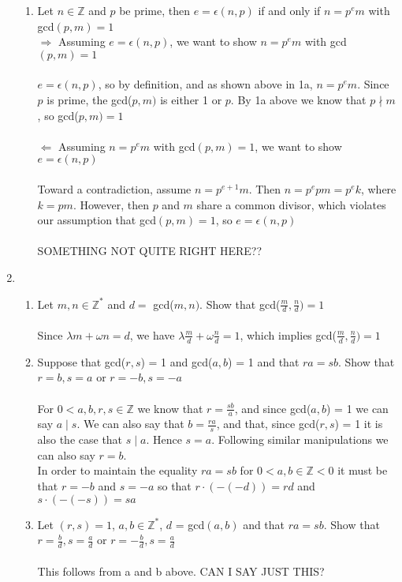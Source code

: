 \documentclass[11pt]{article}
\begin{document}
\begin{enumerate}
\begin{enumerate}
\item Let $n \in \mathbb{Z}$ and $p$ be prime, then $e = \epsilon(n,p)$ if and only if $n = p^em$ with gcd$(p,m) = 1$\\
$\Rightarrow$ Assuming $e = \epsilon(n,p)$, we want to show $n = p^em$ with gcd$(p,m) = 1$\\
\\
$e = \epsilon(n, p)$, so by definition, and as shown above in 1a, $n = p^em$.  Since $p$ is prime, the gcd($p,m)$ is either 1 or $p$.  By 1a above we know that $p \nmid m$, so gcd($p, m) = 1$
\\
\\
$\Leftarrow$ Assuming $n = p^em$ with gcd$(p,m) = 1$, we want to show $e = \epsilon(n,p)$\\
\\
Toward a contradiction, assume $n = p^{e+1}m$.  Then $n = p^epm = p^ek$, where $k = pm$.  However, then $p$ and $m$ share a common divisor, which violates our assumption that gcd$(p,m) = 1$, so $e = \epsilon(n,p)$\\
\\
SOMETHING NOT QUITE RIGHT HERE??
\end{enumerate}


\newpage %
\item 
\begin{enumerate}
\item Let $m,n \in \mathbb{Z}^*$ and $d = $ gcd($m,n)$.  Show that gcd($\tfrac{m}{d} , \tfrac{n}{d}) = 1$
\\\\
Since $\lambda m + \omega n = d$, we have $\lambda \tfrac{m}{d} + \omega \tfrac{n}{d} = 1$, which implies gcd($\tfrac{m}{d} , \tfrac{n}{d}) = 1$
\\
\item Suppose that gcd($r,s$) = 1 and gcd($a,b$) = 1 and that $ra = sb$.  Show that $r=b, s = a$ or $r = -b, s = -a$
\\\\
For $0 < a,b,r,s \in \mathbb{Z}$ we know that $r=\tfrac{sb}{a}$, and since gcd($a,b$) = 1 we can say $a \mid s$.  We can also say that $b=\tfrac{ra}{s}$, and that, since gcd($r,s$) = 1 it is also the case that $s \mid a$.  Hence $s = a$.  Following similar manipulations we can also say $r = b$.
\\
In order to maintain the equality $ra = sb$ for $0 < a,b \in \mathbb{Z} < 0$ it must be that $r = -b$ and $s = -a$ so that $r \cdot (-(-d)) = rd$ and $s \cdot (-(-s)) = sa$
\\
\item Let $(r,s) = 1$, $a,b \in \mathbb{Z}^*$, $d$ = gcd$(a,b)$ and that $ra = sb$.  Show that $r = \tfrac{b}{d}, s = \tfrac{a}{d}$ or $r = -\tfrac{b}{d}, s=\tfrac{a}{d}$
\\\\
This follows from a and b above.  CAN I SAY JUST THIS?
\\


\end{enumerate}
\end{enumerate}
\end{document}
